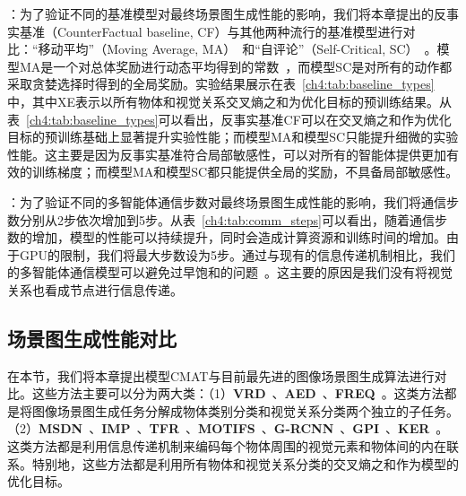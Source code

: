 \textbf{}：为了验证不同的基准模型对最终场景图生成性能的影响，我们将本章提出的反事实基准（CounterFactual baseline, CF）与其他两种流行的基准模型进行对比：“移动平均”（Moving Average, MA）~\cite{weaver2013optimal}和“自评论”（Self-Critical, SC）~\cite{rennie2017self}。模型MA是一个对总体奖励进行动态平均得到的常数~\cite{xu2015show, hu2017learning}，而模型SC是对所有的动作都采取贪婪选择时得到的全局奖励。实验结果展示在表~\ref{ch4:tab:baseline_types}中，其中XE表示以所有物体和视觉关系交叉熵之和为优化目标的预训练结果。从表~\ref{ch4:tab:baseline_types}可以看出，反事实基准CF可以在交叉熵之和作为优化目标的预训练基础上显著提升实验性能；而模型MA和模型SC只能提升细微的实验性能。这主要是因为反事实基准符合局部敏感性，可以对所有的智能体提供更加有效的训练梯度；而模型MA和模型SC都只能提供全局的奖励，不具备局部敏感性。

\textbf{}：为了验证不同的多智能体通信步数对最终场景图生成性能的影响，我们将通信步数分别从2步依次增加到5步。从表~\ref{ch4:tab:comm_steps}可以看出，随着通信步数的增加，模型的性能可以持续提升，同时会造成计算资源和训练时间的增加。由于GPU的限制，我们将最大步数设为5步。通过与现有的信息传递机制相比，我们的多智能体通信模型可以避免过早饱和的问题~\cite{dai2017detecting,xu2017scene}。这主要的原因是我们没有将视觉关系也看成节点进行信息传递。


\subsection{场景图生成性能对比}
在本节，我们将本章提出模型CMAT与目前最先进的图像场景图生成算法进行对比。这些方法主要可以分为两大类：（1）\textbf{VRD}~\cite{lu2016visual}、\textbf{AED}~\cite{newell2017pixels}、\textbf{FREQ}~\cite{zellers2018neural}。这类方法都是将图像场景图生成任务分解成物体类别分类和视觉关系分类两个独立的子任务。（2）\textbf{MSDN}~\cite{li2017scene}、\textbf{IMP}~\cite{xu2017scene}、\textbf{TFR}~\cite{jae2018tensorize}、\textbf{MOTIFS}~\cite{zellers2018neural}、\textbf{G-RCNN}~\cite{yang2018graph}、\textbf{GPI}~\cite{herzig2018mapping}、\textbf{KER}~\cite{chen2019knowledge}。这类方法都是利用信息传递机制来编码每个物体周围的视觉元素和物体间的内在联系。特别地，这些方法都是利用所有物体和视觉关系分类的交叉熵之和作为模型的优化目标。

